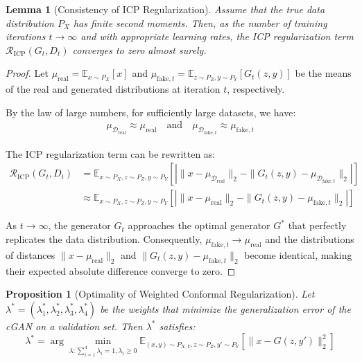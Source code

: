 \documentclass{article}
\theoremstyle{plain}
\newtheorem{lemma}[theorem]{Lemma}
\newtheorem{proposition}[theorem]{Proposition}
\theoremstyle{definition}
\theoremstyle{remark}
\begin{document}
\begin{lemma}[Consistency of ICP Regularization]
Assume that the true data distribution $P_X$ has finite second moments. Then, as the number of training iterations $t \to \infty$ and with appropriate learning rates, the ICP regularization term $\mathcal{R}_{\text{ICP}}(G_t, D_t)$ converges to zero almost surely.
\end{lemma}

\begin{proof}
Let $\mu_{\text{real}} = \mathbb{E}_{x \sim P_X}[x]$ and $\mu_{\text{fake},t} = \mathbb{E}_{z \sim P_Z, y \sim P_Y}[G_t(z, y)]$ be the means of the real and generated distributions at iteration $t$, respectively.

By the law of large numbers, for sufficiently large datasets, we have:
\begin{align}
\mu_{\mathcal{D}_{\text{real}}} \approx \mu_{\text{real}} \quad \text{and} \quad \mu_{\mathcal{D}_{\text{fake},t}} \approx \mu_{\text{fake},t}
\end{align}

The ICP regularization term can be rewritten as:
\begin{align}
\mathcal{R}_{\text{ICP}}(G_t, D_t) &= \mathbb{E}_{x \sim P_X, z \sim P_Z, y \sim P_Y}\left[|\|x - \mu_{\mathcal{D}_{\text{real}}}\|_2 - \|G_t(z, y) - \mu_{\mathcal{D}_{\text{fake},t}}\|_2|\right] \\
&\approx \mathbb{E}_{x \sim P_X, z \sim P_Z, y \sim P_Y}\left[|\|x - \mu_{\text{real}}\|_2 - \|G_t(z, y) - \mu_{\text{fake},t}\|_2|\right]
\end{align}

As $t \to \infty$, the generator $G_t$ approaches the optimal generator $G^*$ that perfectly replicates the data distribution. Consequently, $\mu_{\text{fake},t} \to \mu_{\text{real}}$ and the distributions of distances $\|x - \mu_{\text{real}}\|_2$ and $\|G_t(z, y) - \mu_{\text{fake},t}\|_2$ become identical, making their expected absolute difference converge to zero.
\end{proof}

\begin{proposition}[Optimality of Weighted Conformal Regularization]
Let $\lambda^* = (\lambda_1^*, \lambda_2^*, \lambda_3^*, \lambda_4^*)$ be the weights that minimize the generalization error of the cGAN on a validation set. Then $\lambda^*$ satisfies:
\begin{equation}
\lambda^* = \arg\min_{\lambda: \sum_{i=1}^4 \lambda_i = 1, \lambda_i \geq 0} \mathbb{E}_{(x,y) \sim P_{X,Y}, z \sim P_Z, y' \sim P_Y}\left[\|x - G(z, y')\|_2^2\right]
\end{equation}
\end{proposition}
\end{document}
